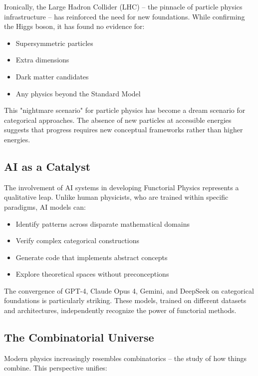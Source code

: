Ironically, the Large Hadron Collider (LHC) -- the pinnacle of particle physics infrastructure -- has reinforced the need for new foundations. While confirming the Higgs boson, it has found no evidence for:

\begin{itemize}[leftmargin=*]
\item Supersymmetric particles
\item Extra dimensions
\item Dark matter candidates
\item Any physics beyond the Standard Model
\end{itemize}

This "nightmare scenario" for particle physics has become a dream scenario for categorical approaches. The absence of new particles at accessible energies suggests that progress requires new conceptual frameworks rather than higher energies.

\subsection{AI as a Catalyst}

The involvement of AI systems in developing Functorial Physics represents a qualitative leap. Unlike human physicists, who are trained within specific paradigms, AI models can:

\begin{itemize}[leftmargin=*]
\item Identify patterns across disparate mathematical domains
\item Verify complex categorical constructions
\item Generate code that implements abstract concepts
\item Explore theoretical spaces without preconceptions
\end{itemize}

The convergence of GPT-4, Claude Opus 4, Gemini, and DeepSeek on categorical foundations is particularly striking. These models, trained on different datasets and architectures, independently recognize the power of functorial methods.

\subsection{The Combinatorial Universe}

Modern physics increasingly resembles combinatorics -- the study of how things combine. This perspective unifies:

